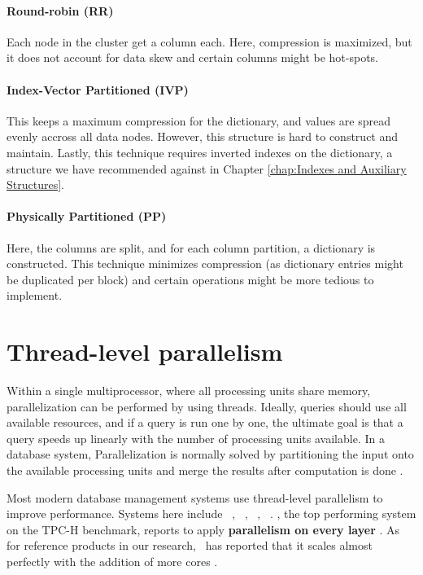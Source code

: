 \paragraph{Round-robin (RR)}
\label{par:Round-robin (RR)}
Each node in the cluster get a column each. Here, compression is maximized, but it does not account for data skew and certain columns might be hot-spots.

\paragraph{Index-Vector Partitioned (IVP)}
\label{par:Index-Vector Partitioned (IVP)}
This keeps a maximum compression for the dictionary, and values are spread evenly accross all data nodes. However, this structure is hard to construct and maintain. Lastly, this technique requires inverted indexes on the dictionary, a structure we have recommended against in Chapter \ref{chap:Indexes and Auxiliary Structures}.

\paragraph{Physically Partitioned (PP)}
\label{par:Physically Partitioned (PP)}
Here, the columns are split, and for each column partition, a dictionary is constructed. This technique minimizes compression (as dictionary entries might be duplicated per block) and certain operations might be more tedious to implement. 

\section{Thread-level parallelism}
\label{sec:Intra-query Parallelism and Scheduling}
Within a single multiprocessor, where all processing units share memory, parallelization can be performed by using threads. Ideally, queries should use all available resources, and if a query is run one by one, the ultimate goal is that a query speeds up linearly with the number of processing units available. In a database system, Parallelization is normally solved by partitioning the input onto the available processing units and merge the results after computation is done \cite{Neumann2011-uq}.

Most modern database management systems use thread-level parallelism to improve performance. Systems here include \vertica~\cite{Lamb2012-kg}, \mssql~\cite{Larson2013-mc}, \blink~\cite{Barber2012-xt, Johnson2008-cp}, \saph~\cite{Farber2012-vh}. \exasol, the top performing system on the TPC-H benchmark, reports to apply \textbf{parallelism on every layer} \cite{Exasol2014-xh}. As for reference products in our research, \qlikview~has reported that it scales almost perfectly with the addition of more cores \cite{Qlik2011-ef}.

